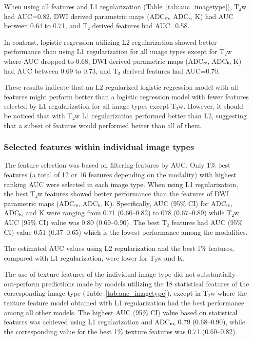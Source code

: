 When using all features and L1 regularization (Table~\ref{tab:auc_imagetype}),
T₂w had AUC=0.82, DWI derived parametric maps (ADCₘ, ADCₖ, K) had AUC between
0.64 to 0.71, and T₂ derived features had AUC=0.58.

In contrast, logistic regression utilizing L2 regularization showed better
performance than using L1 regularization for all image types except for T₂w
where AUC dropped to 0.68, DWI derived parametric maps (ADCₘ, ADCₖ, K) had AUC
between 0.69 to 0.73, and T₂ derived features had AUC=0.70.

These results indicate that an L2 regularized logistic regression model with
all features might perform better than a logistic regression model with fewer
features selected by L1 regularization for all image types except T₂w. However,
it should be noticed that with T₂w L1 regularization performed better than L2,
suggesting that a subset of features would performed better than all of them.


\subsubsection{Selected features within individual image types}

The feature selection was based on filtering features by AUC\@. Only 1\% best
features (a total of 12 or 16 features depending on the modality) with highest
ranking AUC were selected in each image type. When using L1 regularization, the
best T₂w features showed better performance than the features of DWI
parametric maps (ADCₘ, ADCₖ, K). Specifically, AUC (95\% CI) for ADCₘ, ADCₖ,
and K were ranging from 0.71 (0.60--0.82) to 078 (0.67--0.89) while T₂w AUC
(95\% CI) value was 0.80 (0.69--0.90). The best T₂ features had AUC (95\% CI)
value 0.51 (0.37--0.65) which is the lowest performance among the modalities.

The estimated AUC values using L2 regularization and the best 1\% features,
compared with L1 regularization, were lower for T₂w and K.

The use of texture features of the individual image type did not substantially
out-perform predictions made by models utilizing the 18 statistical features of
the corresponding image type (Table~\ref{tab:auc_imagetype}), except in T₂w
where the texture feature model obtained with L1 regularization had the best
performance among all other models. The highest AUC (95\% CI) value based on
statistical features was achieved using L1 regularization and ADCₘ, 0.79
(0.68--0.90), while the corresponding value for the best 1\% texture features
was 0.71 (0.60--0.82).

